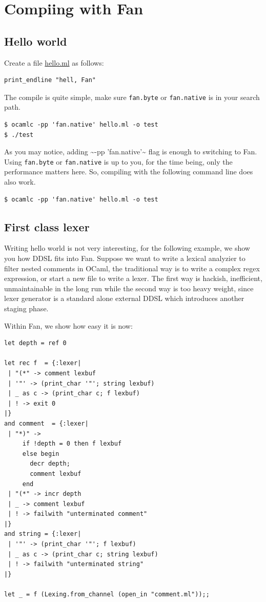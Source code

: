 \documentclass[11pt]{article}
\begin{document}
\section{Compiing with Fan}
\label{sec-3}

\subsection{Hello world \label{hello}}
\label{sec-3-1}
Create a file \href{code/hello.ml}{hello.ml} as follows:

\begin{verbatim}
print_endline "hell, Fan"
\end{verbatim}

The compile is quite simple, make sure \texttt{fan.byte} or \texttt{fan.native} is
in your search path.

\begin{verbatim}
$ ocamlc -pp 'fan.native' hello.ml -o test
$ ./test
\end{verbatim}

As you may notice, adding \textasciitilde{}-pp 'fan.native'\textasciitilde{} flag is enough to
switching to Fan. Using \texttt{fan.byte} or \texttt{fan.native} is up to you,
for the time being, only the performance matters here. So,
compiling with the following command line does also work.

\begin{verbatim}
$ ocamlc -pp 'fan.native' hello.ml -o test
\end{verbatim}
\subsection{First class lexer}
\label{sec-3-2}

Writing hello world is not very interesting, for the following
example, we show you how DDSL fits into Fan. Suppose we want to
write a lexical analyzier to filter nested comments in OCaml, the
traditional way is to write a complex regex expression, or start a
new file to write a lexer. The first way is hackish, inefficient,
unmaintainable in the long run while the second way is too heavy
weight, since lexer generator is a standard alone external DDSL which
introduces another staging phase.

Within Fan,  we show how easy it is now:
\begin{verbatim}
let depth = ref 0

let rec f  = {:lexer|
 | "(*" -> comment lexbuf
 | '"' -> (print_char '"'; string lexbuf)
 | _ as c -> (print_char c; f lexbuf)
 | ! -> exit 0
|}
and comment  = {:lexer|
 | "*)" ->
     if !depth = 0 then f lexbuf
     else begin
       decr depth;
       comment lexbuf
     end
 | "(*" -> incr depth
 | _ -> comment lexbuf
 | ! -> failwith "unterminated comment"
|}
and string = {:lexer|
 | '"' -> (print_char '"'; f lexbuf)
 | _ as c -> (print_char c; string lexbuf)
 | ! -> failwith "unterminated string"
|}

let _ = f (Lexing.from_channel (open_in "comment.ml"));;
\end{verbatim}
\end{document}
